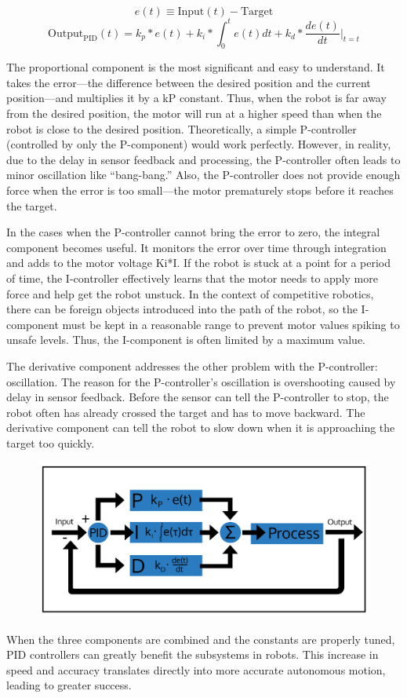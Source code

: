 \[ e(t) \equiv \text{Input}(t) - \text{Target} \]
\[ \text{Output}_{\text{PID}}(t) = k_p * e(t) + k_i * \int_0^t{e(t)dt} + k_d * \frac{de(t)}{dt}|_{t=t} \]

The proportional component is the most significant and easy to understand. It takes the error—the difference between the desired position and the current position—and multiplies it by a kP constant. Thus, when the robot is far away from the desired position, the motor will run at a higher speed than when the robot is close to the desired position. Theoretically, a simple P-controller (controlled by only the P-component) would work perfectly. However, in reality, due to the delay in sensor feedback and processing, the P-controller often leads to minor oscillation like “bang-bang.” Also, the P-controller does not provide enough force when the error is too small—the motor prematurely stops before it reaches the target.

In the cases when the P-controller cannot bring the error to zero, the integral component becomes useful. It monitors the error over time through integration and adds to the motor voltage Ki*I. If the robot is stuck at a point for a period of time, the I-controller effectively learns that the motor needs to apply more force and help get the robot unstuck. In the context of competitive robotics, there can be foreign objects introduced into the path of the robot, so the I-component must be kept in a reasonable range to prevent motor values spiking to unsafe levels. Thus, the I-component is often limited by a maximum value.

The derivative component addresses the other problem with the P-controller: oscillation. The reason for the P-controller’s oscillation is overshooting caused by delay in sensor feedback. Before the sensor can tell the P-controller to stop, the robot often has already crossed the target and has to move backward. The derivative component can tell the robot to slow down when it is approaching the target too quickly.

\begin{figure}[H]
    \centering
    \includegraphics[scale=0.3]{assets/pid-graphic.png}
\end{figure}

When the three components are combined and the constants are properly tuned, PID controllers can greatly benefit the subsystems in robots. This increase in speed and accuracy translates directly into more accurate autonomous motion, leading to greater success.